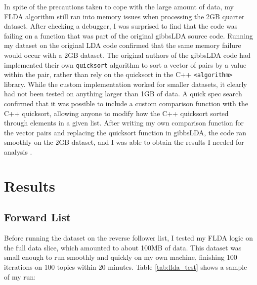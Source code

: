 \documentclass[a4paper]{article}
\begin{document}
In spite of the precautions taken to cope with the large amount of data, my FLDA algorithm still ran into memory issues when processing the 2GB quarter dataset. After checking a debugger, I was surprised to find that the code was failing on a function that was part of the original gibbsLDA source code. Running my dataset on the original LDA code confirmed that the same memory failure would occur with a 2GB dataset. The original authors of the gibbsLDA code had implemented their own \verb+quicksort+ algorithm to sort a vector of pairs by a value within the pair, rather than rely on the quicksort in the C++ \verb+<algorithm>+ library. While the custom implementation worked for smaller datasets, it clearly had not been tested on anything larger than 1GB of data. A quick spec search confirmed that it was possible to include a custom comparison function with the C++ quicksort, allowing anyone to modify how the C++ quicksort sorted through elements in a given list. After writing my own comparison function for the vector pairs and replacing the quicksort function in gibbsLDA, the code ran smoothly on the 2GB dataset, and I was able to obtain the results I needed for analysis \cite{gibbs_lda}.

\section{Results}
\label{sec:results}
\subsection{Forward List}\label{sec:forward_flda}
Before running the dataset on the reverse follower list, I tested my FLDA logic on the full data slice, which amounted to about 100MB of data. This dataset was small enough to run smoothly and quickly on my own machine, finishing 100 iterations on 100 topics within 20 minutes. Table \ref{tab:flda_test} shows a sample of my run:
\end{document}
